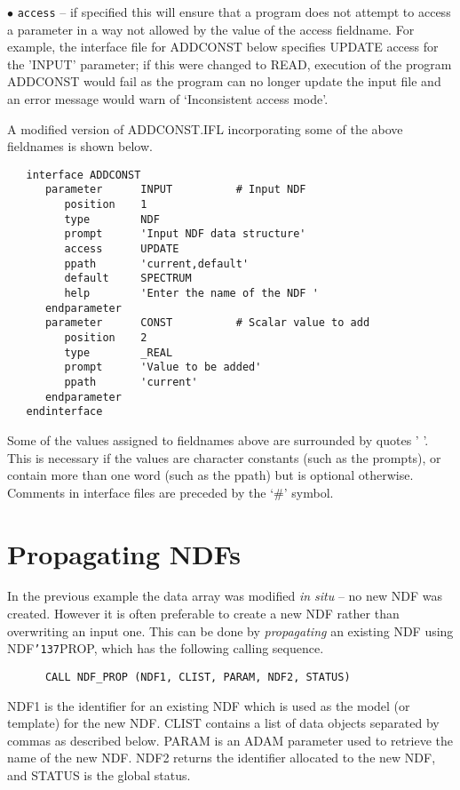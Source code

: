 \documentclass[twoside,11pt]{article}
\renewcommand{\_}{{\tt\char'137}}
\newcommand{\xlabel}[1]{}
\begin{document}
\begin{description}
\item{$\bullet$ \tt access} -- if specified this will ensure that a program 
does not attempt to access a parameter in a way not allowed by the 
value of the access fieldname.
For example, the interface file for ADDCONST below specifies UPDATE access
for the 'INPUT' parameter;
if this
were changed to READ, execution of the program ADDCONST would fail as the 
program can no longer update the input file and 
an error message would warn of 
`Inconsistent access mode'.
\end{description}
A modified version of ADDCONST.IFL incorporating some of the above 
fieldnames is shown below.
\begin{verbatim}
   interface ADDCONST
      parameter      INPUT          # Input NDF
         position    1
         type        NDF
         prompt      'Input NDF data structure'
         access      UPDATE
         ppath       'current,default'
         default     SPECTRUM
         help        'Enter the name of the NDF '
      endparameter
      parameter      CONST          # Scalar value to add
         position    2
         type        _REAL
         prompt      'Value to be added'
         ppath       'current'
      endparameter
   endinterface
\end{verbatim}
Some of the values assigned to fieldnames above are surrounded by quotes ' '.
This is necessary if the values are character constants (such as the prompts),
or contain more than one word (such as the ppath)  but is optional otherwise.
Comments in interface files are preceded by the `\#' symbol.

\newpage
\section{Propagating NDFs\label{prop}\xlabel{propagating_ndfs}}

In the previous  example the data array was modified {\sl in situ} --
no new NDF was created.
However it is often preferable to create a new NDF rather than overwriting an
input one.
This can be done by {\sl propagating\/} an existing NDF using
NDF\_PROP, which has the following calling sequence.
\begin{verbatim}
      CALL NDF_PROP (NDF1, CLIST, PARAM, NDF2, STATUS)
\end{verbatim}	
NDF1 is the identifier for an existing NDF which is used 
as the model (or template) for the new NDF.
CLIST contains a list of data objects separated by commas as described 
below.
PARAM is an ADAM parameter used to retrieve the name of the new  NDF.
NDF2 returns the identifier allocated to the new NDF, and STATUS is the global 
status.
\end{document}
